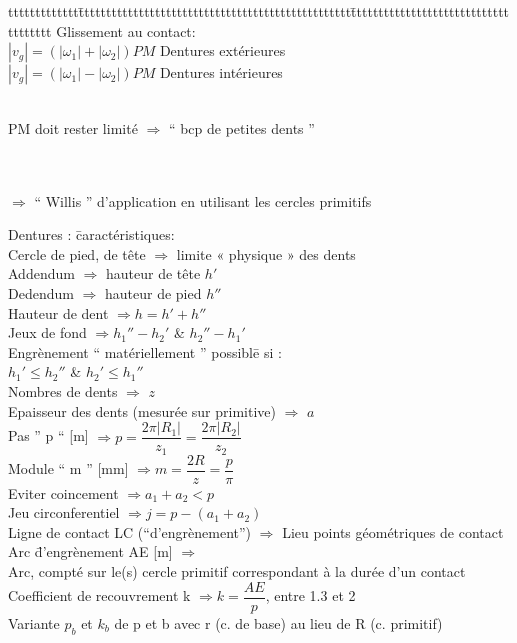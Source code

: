 \begin{bluebox}
\begin{tabbing}
ttttttttttttt\=tttttttttttttttttttttttttttttttttttttttttttttttttt\=ttttttttttttttttttttttttttttttttttttt\kill
Glissement au contact: \\
\> $|v_g|=(|\omega_1|+|\omega_2|)PM$\> Dentures {\color{orange}extérieures}\\
\> $|v_g|=(|\omega_1|-|\omega_2|)PM$\> Dentures {\color{orange}intérieures}\\\\
\begin{orangebox}
PM doit rester limité $\Rightarrow$ “ bcp de petites dents ”
\end{orangebox}
\end{tabbing}
\end{bluebox}\\\\

$\Rightarrow$ “ Willis ” d’application en utilisant les cercles primitifs\\

\begin{orangebox}
\begin{tabbing}
Dentures : \=caractéristiques:\\
\> Cercle de pied, de tête $\Rightarrow$ limite « physique » des dents\\
\> Addendum $\Rightarrow$ hauteur de tête $h'$\\
\> Dedendum $\Rightarrow$ hauteur de pied $h''$\\
\> Hauteur de dent $\Rightarrow h = h' + h''$\\
\> Jeux de fond $\Rightarrow h_1''-h_2'$ \& $h_2''-h_1'$\\
\> Engrènement “ matériellement ” possibl\=e si :\\
\>\>$h_1'\leq h_2''$ \& $h_2'\leq h_1''$\\
\> Nombres de dents $\Rightarrow$ $z$\\
\> Epaisseur des dents (mesurée sur primitive) $\Rightarrow$ $a$\\
\> Pas ” p “ [m] $\Rightarrow p = \dfrac{2\pi|R_1|}{z_1}= \dfrac{2\pi|R_2|}{z_2}$\\
\> Module “ m ” [mm] $\Rightarrow m = \dfrac{2R}{z} = \dfrac{p}{\pi}$\\
\> Eviter coincement $\Rightarrow a_1+a_2<p$\\
\> Jeu circonferentiel $\Rightarrow j = p-(a_1+a_2)$\\
\> Ligne de contact LC (“d’engrènement”) $\Rightarrow$ Lieu points géométriques de contact\\
\> Arc \=d’engrènement AE [m] $\Rightarrow$\\
\>\>Arc, compté sur le(s) cercle primitif correspondant à la durée d’un contact\\
\>Coefficient de recouvrement k $\Rightarrow k = \dfrac{AE}{p}$, entre 1.3 et 2\\
\> Variante $p_b$ et $k_b$ de p et b avec r (c. de base) au lieu de R (c. primitif)
\end{tabbing}
\end{orangebox}\\\\

